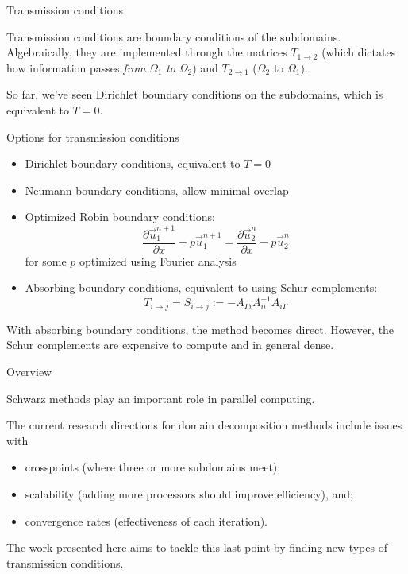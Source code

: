 \documentclass{beamer}
\begin{document}
\begin{frame}{Transmission conditions}

Transmission conditions are boundary conditions of the subdomains.
Algebraically, they are implemented through the matrices $T_{1 \to 2}$ (which dictates how information passes \textit{from} $\Omega_1$ \textit{to} $\Omega_2$) and $T_{2 \to 1}$ ($\Omega_2$ to $\Omega_1$).

So far, we've seen Dirichlet boundary conditions on the subdomains, which is equivalent to $T=0$.

\end{frame}

\begin{frame}{Options for transmission conditions}

\begin{itemize}
\item Dirichlet boundary conditions, equivalent to $T=0$
\item Neumann boundary conditions, allow minimal overlap
\item Optimized Robin boundary conditions:
\begin{equation*}
	\frac{\partial \vec{u}_1^{n+1}}{\partial x} - p \vec{u}_1^{n+1} = \frac{\partial \vec{u}_2^{n}}{\partial x} - p \vec{u}_2^{n}
\end{equation*}
for some $p$ optimized using Fourier analysis
\item Absorbing boundary conditions, equivalent to using Schur complements:
\begin{equation*}
	T_{i \to j} = S_{i \to j} := -A_{\Gamma i} A_{ii}^{-1} A_{i \Gamma}
\end{equation*}
\end{itemize}
With absorbing boundary conditions, the method becomes direct.
However, the Schur complements are expensive to compute and in general dense.

\end{frame}

\begin{frame}{Overview}

Schwarz methods play an important role in parallel computing.

The current research directions for domain decomposition methods include issues with 
\begin{itemize}
\item crosspoints (where three or more subdomains meet);
\item scalability (adding more processors should improve efficiency), and;
\item convergence rates (effectiveness of each iteration).
\end{itemize}

The work presented here aims to tackle this last point by finding new types of transmission conditions.
\end{frame}
\end{document}
